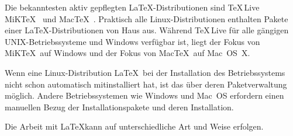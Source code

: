 \documentclass[a4paper,10pt,twoside]{scrbook}
\begin{document}
Die bekanntesten aktiv gepflegten \LaTeX-Distributionen sind \TeX\,Live~\cite{TeXLive_Webpage} MiK\TeX~\cite{MiKTeX_Webpage} und Mac\TeX~\cite{MacTeX_Webpage}. 
Praktisch alle Linux-Distributionen enthalten Pakete einer \LaTeX-Distributionen von Haus aus. Während \TeX\,Live für alle gängigen UNIX-Betriebssysteme und Windows verfügbar ist, liegt der Fokus von MiK\TeX\ auf Windows und der Fokus von Mac\TeX\ auf Mac~OS~X.

Wenn eine Linux-Distribution \LaTeX\ bei der Installation des Betriebssystems nicht schon automatisch mitinstalliert hat, ist das über deren Paketverwaltung möglich. Andere Betriebssystemen wie Windows und Mac~OS erfordern einen manuellen Bezug der Installationspakete und deren Installation.

Die Arbeit mit \LaTeX kann auf unterschiedliche Art und Weise erfolgen.
\end{document}
